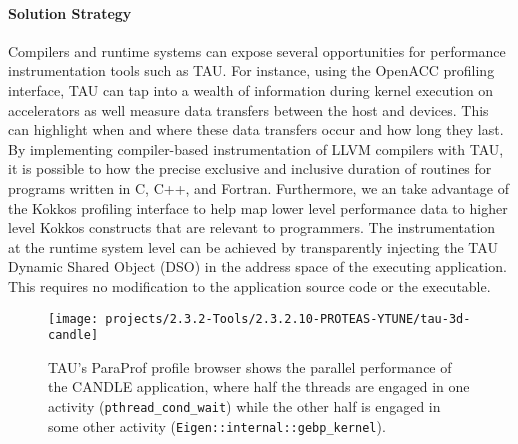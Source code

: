 \paragraph{Solution Strategy} Compilers and runtime systems can expose several opportunities for performance instrumentation tools such as TAU.  For instance, using the OpenACC profiling interface, TAU can tap into a wealth of information during kernel execution on accelerators as well measure data transfers between the host and devices. This can highlight when and where these data transfers occur and how long they last.  By implementing compiler-based instrumentation of LLVM compilers with TAU, it is possible to how the precise exclusive and inclusive duration of routines for programs written in C, C++, and Fortran.  Furthermore, we an take advantage of the Kokkos profiling interface to help map lower level performance data to higher level Kokkos constructs that are relevant to programmers. The instrumentation at the runtime system level can be achieved by transparently injecting the TAU Dynamic Shared Object (DSO) in the address space of the executing application. This requires no modification to the application source code or the executable. 

\begin{figure}[htb]
\centering
\texttt{[image: projects/2.3.2-Tools/2.3.2.10-PROTEAS-YTUNE/tau-3d-candle]}
\caption{
  TAU's ParaProf profile browser shows the parallel performance of the CANDLE application, where half the threads are engaged in one activity (\texttt{pthread\_cond\_wait}) while the other half is engaged in some other activity (\texttt{Eigen::internal::gebp\_kernel}).
}
\label{figure:tau}
\end{figure}

